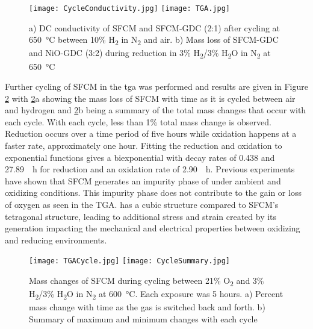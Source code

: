         \begin{figure}
          \texttt{[image: CycleConductivity.jpg]}
          \texttt{[image: TGA.jpg]}
          \caption{a) DC conductivity of SFCM and SFCM-GDC (2:1) after cycling at \SI{650}{\celsius} between 10\% H\textsubscript{2} in N\textsubscript{2} and air. b) Mass loss of SFCM-GDC and NiO-GDC (3:2) during reduction in 3\% H\textsubscript{2}/3\% H\textsubscript{2}O in N\textsubscript{2} at \SI{650}{\celsius}}
          \label{fig:TGA}
        \end{figure}

        Further cycling of SFCM in the \gls{tga} was performed and results are given in Figure \ref{fig:Cycled} with \ref{fig:Cycled}a showing the mass loss of SFCM with time as it is cycled between air and hydrogen and \ref{fig:Cycled}b being a summary of the total mass changes that occur with each cycle.
        With each cycle, less than 1\% total mass change is observed.
        Reduction occurs over a time period of five hours while oxidation happens at a faster rate, approximately one hour.
        Fitting the reduction and oxidation to exponential functions gives a biexponential with decay rates of 0.438 and \SI{27.89}{\per\hour} for reduction and an oxidation rate of \SI{2.90}{\per\hour}.
        Previous experiments have shown that SFCM generates an impurity phase of  under ambient and oxidizing conditions.\cite{Stanleya}
        This impurity phase does not contribute to the gain or loss of oxygen as seen in the TGA.
         has a cubic structure compared to SFCM's tetragonal structure, leading to additional stress and strain created by its generation impacting the mechanical and electrical properties between oxidizing and reducing environments.

        \begin{figure}
          \texttt{[image: TGACycle.jpg]}
          \texttt{[image: CycleSummary.jpg]}
          \caption{Mass changes of SFCM during cycling between 21\% O\textsubscript{2} and 3\% H\textsubscript{2}/3\% H\textsubscript{2}O in N\textsubscript{2} at \SI{600}{\celsius}. Each exposure was 5 hours. a) Percent mass change with time as the gas is switched back and forth. b) Summary of maximum and minimum changes with each cycle}
          \label{fig:Cycled}
        \end{figure}

